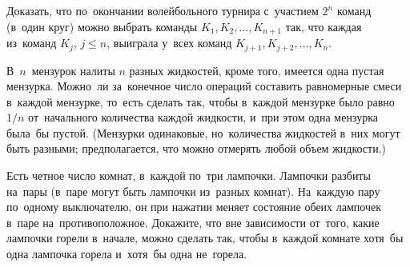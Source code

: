 \begin{problems}
\item
Доказать, что по~окончании волейбольного турнира с~участием $2^n$ команд
(в~один круг) можно выбрать команды $K_1, K_2, \dots, K_{n+1}$ так, что каждая
из~команд $K_j$, $j \leq n$, выиграла у~всех команд
$K_{j+1}, K_{j+2}, \ldots, K_n$.

\item
В~$n$~мензурок налиты $n$ разных жидкостей, кроме того, имеется одна пустая
мензурка.
Можно~ли за~конечное число операций составить равномерные смеси в~каждой
мензурке, то~есть сделать так, чтобы в~каждой мензурке было равно $1 / n$
от~начального количества каждой жидкости, и~при этом одна мензурка была~бы
пустой.
(Мензурки одинаковые, но~количества жидкостей в~них могут быть разными;
предполагается, что можно отмерять любой объем жидкости.)

\item
Есть четное число комнат, в~каждой по~три лампочки.
Лампочки разбиты на~пары (в~паре могут быть лампочки из~разных комнат).
На~каждую пару по~одному выключателю, он при нажатии меняет состояние обеих
лампочек в~паре на~противоположное.
Докажите, что вне зависимости от~того, какие лампочки горели в~начале, можно
сделать так, чтобы в~каждой комнате хотя~бы одна лампочка горела и~хотя~бы одна
не~горела.

\end{problems}

